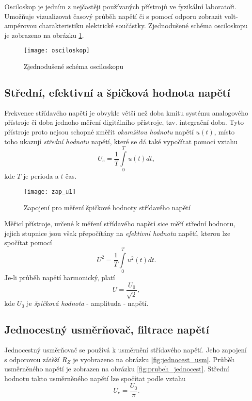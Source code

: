 \documentclass[0-protokol.tex]{subfiles}
\begin{document}
Osciloskop je jedním z nejčastěji používaných přístrojů ve fyzikální laboratoři. Umožňuje vizualizovat časový průběh napětí či s pomocí odporu zobrazit volt-ampérovou charakteristiku elektrické součástky. Zjednodušené schéma osciloskopu je zobrazeno na obrázku \ref{fig:osciloskop}.

\begin{figure}[H]
\centering
\texttt{[image: osciloskop]}
\caption{Zjednodušené schéma osciloskopu \cite{osciloskop}}
\label{fig:osciloskop}
\end{figure}

\subsection*{Střední, efektivní a špičková hodnota napětí}
Frekvence střídavého napětí je obvykle větší než doba kmitu systému analogového přístroje či doba jednoho
měření digitálního přístroje, tzv. integrační doba. Tyto přístroje proto nejsou schopné změřit \textit{okamžitou hodnotu} napětí $u(t)$, místo toho ukazují \textit{střední hodnotu} napětí, které se dá také vypočítat pomocí vztahu
\begin{equation}
U_e = \frac{1}{T} \int\limits_0^T u(t) dt,
\end{equation}
kde $T$ je perioda a $t$ čas.

\begin{figure}[H]
\centering
\texttt{[image: zap\_u1]}
\caption{Zapojení pro měření špičkové hodnoty střídavého napětí}
\label{fig:zap_u1}
\end{figure}

Měřicí přístroje, určené k měření střídavého napětí sice měří střední hodnotu, jejich stupnice jsou však přepočítány na \textit{efektivní hodnotu} napětí, kterou lze spočítat pomocí
\begin{equation}
U^2 = \frac{1}{T} \int\limits_0^T u^2(t) dt.
\end{equation}
Je-li průběh napětí harmonický, platí 
\begin{equation} \label{eq:ef_napeti}
U = \frac{U_0}{\sqrt{2}},
\end{equation}
kde $U_0$ je \textit{špičková hodnota} - amplituda - napětí.

\subsection*{Jednocestný usměrňovač, filtrace napětí}
Jednocestný usměrňovač se používá k usměrnění střídavého napětí. Jeho zapojení s odporovou zátěží $R_Z$ je vyobrazeno na obrázku \ref{fig:jednocest_usm}. Průběh usměrněného napětí je zobrazen na obrázku \ref{fig:prubeh_jednocest}. Střední hodnotu takto usměrněného napětí lze spočítat podle vztahu
\begin{equation}
U_e = \frac{U_0}{\pi}.
\end{equation}
\end{document}
